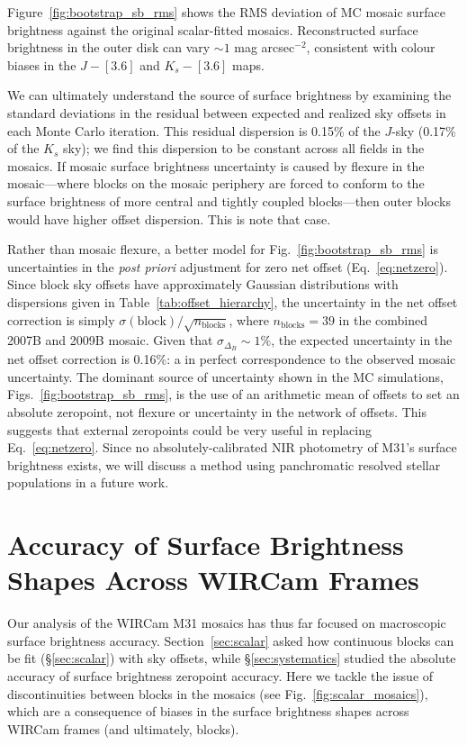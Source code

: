 \documentclass[iop]{emulateapj}
\newcommand{\Fig}[1]{Fig.~\ref{fig:#1}}  %
\newcommand{\Eq}[1]{Eq.~\ref{eq:#1}}  %
\newcommand{\Tab}[1]{Table~\ref{tab:#1}}  %
\newcommand{\Sec}[1]{\S\ref{sec:#1}}  %
\begin{document}
Figure~\ref{fig:bootstrap_sb_rms} shows the RMS deviation of MC mosaic surface brightness against the original scalar-fitted mosaics.
Reconstructed surface brightness in the outer disk can vary $\sim 1$ mag arcsec$^{-2}$, consistent with colour biases in the $J-[3.6]$ and $K_s-[3.6]$ maps.

We can ultimately understand the source of surface brightness by examining the standard deviations in the residual between expected and realized sky offsets in each Monte Carlo iteration.
This residual dispersion is 0.15\% of the $J$-sky (0.17\% of the $K_s$ sky); we find this dispersion to be constant across all fields in the mosaics.
If mosaic surface brightness uncertainty is caused by flexure in the mosaic---where blocks on the mosaic periphery are forced to conform to the surface brightness of more central and tightly coupled blocks---then outer blocks would have higher offset dispersion.
This is note that case.

Rather than mosaic flexure, a better model for \Fig{bootstrap_sb_rms} is uncertainties in the \textit{post priori} adjustment for zero net offset (\Eq{netzero}).
Since block sky offsets have approximately Gaussian distributions with dispersions given in \Tab{offset_hierarchy}, the uncertainty in the net offset correction is simply $\sigma(\mathrm{block})/\sqrt{n_\mathrm{blocks}}$, where $n_\mathrm{blocks}=39$ in the combined 2007B and 2009B mosaic.
Given that $\sigma_{\Delta_B}\sim 1\%$, the expected uncertainty in the net offset correction is 0.16\%: a in perfect correspondence to the observed mosaic uncertainty.
The dominant source of uncertainty shown in the MC simulations, Figs.~\ref{fig:bootstrap_sb_rms}, is the use of an arithmetic mean of offsets to set an absolute zeropoint, not flexure or uncertainty in the network of offsets.
This suggests that external zeropoints could be very useful in replacing \Eq{netzero}.
Since no absolutely-calibrated NIR photometry of M31's surface brightness exists, we will discuss a method using panchromatic resolved stellar populations in a future work.

\section{Accuracy of Surface Brightness Shapes Across WIRCam Frames}
\label{sec:skyflatstability}

Our analysis of the WIRCam M31 mosaics has thus far focused on macroscopic surface brightness accuracy.
Section~\ref{sec:scalar} asked how continuous blocks can be fit (\Sec{scalar}) with sky offsets, while \Sec{systematics} studied the absolute accuracy of surface brightness zeropoint accuracy.
Here we tackle the issue of discontinuities between blocks in the mosaics (see \Fig{scalar_mosaics}), which are a consequence of biases in the surface brightness shapes across WIRCam frames (and ultimately, blocks).
\end{document}
